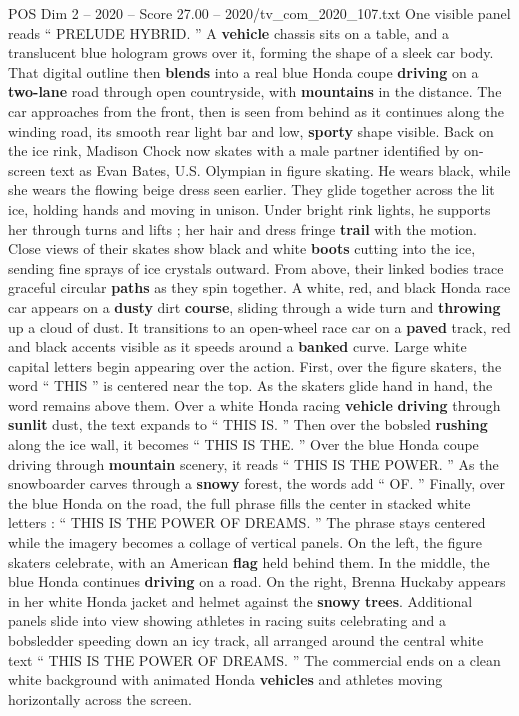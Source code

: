 \begin{textsample}{POS Dim 2 – 2020 – Score 27.00 – 2020/tv\_com\_2020\_107.txt}
One visible panel reads “ PRELUDE HYBRID. ” A \textbf{vehicle} chassis sits on a table, and a translucent blue hologram grows over it, forming the shape of a sleek car body.
That digital outline then \textbf{blends} into a real blue Honda coupe \textbf{driving} on a \textbf{two-lane} road through open countryside, with \textbf{mountains} in the distance.
The car approaches from the front, then is seen from behind as it continues along the winding road, its smooth rear light bar and low, \textbf{sporty} shape visible.
Back on the ice rink, Madison Chock now skates with a male partner identified by on-screen text as Evan Bates, U.S.
Olympian in figure skating.
He wears black, while she wears the flowing beige dress seen earlier.
They glide together across the lit ice, holding hands and moving in unison.
Under bright rink lights, he supports her through turns and lifts ; her hair and dress fringe \textbf{trail} with the motion.
Close views of their skates show black and white \textbf{boots} cutting into the ice, sending fine sprays of ice crystals outward.
From above, their linked bodies trace graceful circular \textbf{paths} as they spin together.
A white, red, and black Honda race car appears on a \textbf{dusty} dirt \textbf{course}, sliding through a wide turn and \textbf{throwing} up a cloud of dust.
It transitions to an open-wheel race car on a \textbf{paved} track, red and black accents visible as it speeds around a \textbf{banked} curve.
Large white capital letters begin appearing over the action.
First, over the figure skaters, the word “ THIS ” is centered near the top.
As the skaters glide hand in hand, the word remains above them.
Over a white Honda racing \textbf{vehicle} \textbf{driving} through \textbf{sunlit} dust, the text expands to “ THIS IS. ” Then over the bobsled \textbf{rushing} along the ice wall, it becomes “ THIS IS THE. ” Over the blue Honda coupe driving through \textbf{mountain} scenery, it reads “ THIS IS THE POWER. ” As the snowboarder carves through a \textbf{snowy} forest, the words add “ OF. ” Finally, over the blue Honda on the road, the full phrase fills the center in stacked white letters : “ THIS IS THE POWER OF DREAMS. ” The phrase stays centered while the imagery becomes a collage of vertical panels.
On the left, the figure skaters celebrate, with an American \textbf{flag} held behind them.
In the middle, the blue Honda continues \textbf{driving} on a road.
On the right, Brenna Huckaby appears in her white Honda jacket and helmet against the \textbf{snowy} \textbf{trees}.
Additional panels slide into view showing athletes in racing suits celebrating and a bobsledder speeding down an icy track, all arranged around the central white text “ THIS IS THE POWER OF DREAMS. ” The commercial ends on a clean white background with animated Honda \textbf{vehicles} and athletes moving horizontally across the screen.

\end{textsample}
